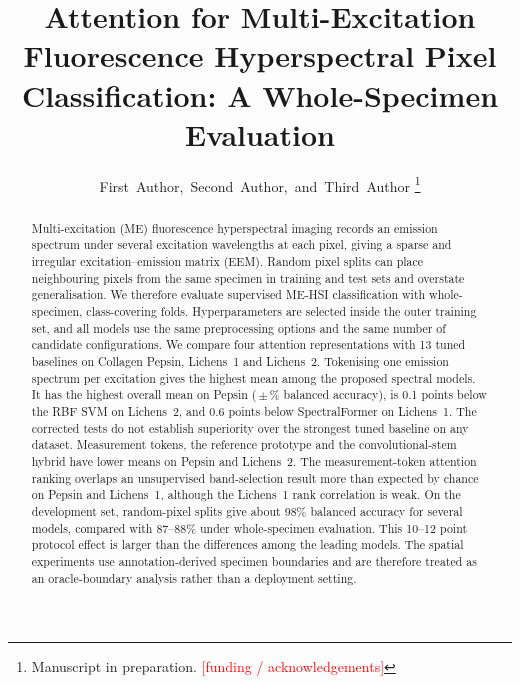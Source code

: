 \documentclass[journal]{IEEEtran}
\newcommand{\RESULT}[1]{\textcolor{red}{[#1]}}
\begin{document}
\title{Attention for Multi-Excitation Fluorescence Hyperspectral Pixel Classification: A Whole-Specimen Evaluation}

\author{First~Author,~Second~Author,~and~Third~Author%
\thanks{Manuscript in preparation. \RESULT{funding / acknowledgements}}}


\maketitle

\begin{abstract}
Multi-excitation (ME) fluorescence hyperspectral imaging records an emission spectrum under several excitation wavelengths at each pixel, giving a sparse and irregular excitation--emission matrix (EEM). Random pixel splits can place neighbouring pixels from the same specimen in training and test sets and overstate generalisation. We therefore evaluate supervised ME-HSI classification with whole-specimen, class-covering folds. Hyperparameters are selected inside the outer training set, and all models use the same preprocessing options and the same number of candidate configurations. We compare four attention representations with 13 tuned baselines on Collagen Pepsin, Lichens~1 and Lichens~2. Tokenising one emission spectrum per excitation gives the highest mean among the proposed spectral models. It has the highest overall mean on Pepsin (\BestOursAccPepsinSpectral\,$\pm$\,\BestOursStdPepsinSpectral\% balanced accuracy), is 0.1 points below the RBF SVM on Lichens~2, and 0.6 points below SpectralFormer on Lichens~1. The corrected tests do not establish superiority over the strongest tuned baseline on any dataset. Measurement tokens, the reference prototype and the convolutional-stem hybrid have lower means on Pepsin and Lichens~2. The measurement-token attention ranking overlaps an unsupervised band-selection result more than expected by chance on Pepsin and Lichens~1, although the Lichens~1 rank correlation is weak. On the development set, random-pixel splits give about 98\% balanced accuracy for several models, compared with 87--88\% under whole-specimen evaluation. This 10--12 point protocol effect is larger than the differences among the leading models. The spatial experiments use annotation-derived specimen boundaries and are therefore treated as an oracle-boundary analysis rather than a deployment setting.
\end{abstract}
\end{document}
